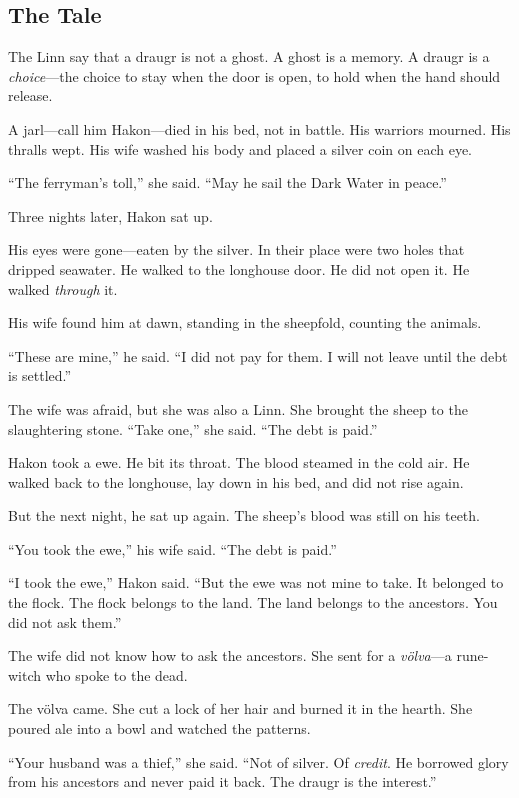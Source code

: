 \documentclass[9pt,a5paper]{extbook}
\begin{document}
\subsection*{The Tale}

The Linn say that a draugr is not a ghost. A ghost is a memory. A draugr is a \textit{choice}---the choice to stay when the door is open, to hold when the hand should release.

A jarl---call him Hakon---died in his bed, not in battle. His warriors mourned. His thralls wept. His wife washed his body and placed a silver coin on each eye.

``The ferryman's toll,'' she said. ``May he sail the Dark Water in peace.''

Three nights later, Hakon sat up.

His eyes were gone---eaten by the silver. In their place were two holes that dripped seawater. He walked to the longhouse door. He did not open it. He walked \textit{through} it.

His wife found him at dawn, standing in the sheepfold, counting the animals.

``These are mine,'' he said. ``I did not pay for them. I will not leave until the debt is settled.''

The wife was afraid, but she was also a Linn. She brought the sheep to the slaughtering stone. ``Take one,'' she said. ``The debt is paid.''

Hakon took a ewe. He bit its throat. The blood steamed in the cold air. He walked back to the longhouse, lay down in his bed, and did not rise again.

But the next night, he sat up again. The sheep's blood was still on his teeth.

``You took the ewe,'' his wife said. ``The debt is paid.''

``I took the ewe,'' Hakon said. ``But the ewe was not mine to take. It belonged to the flock. The flock belongs to the land. The land belongs to the ancestors. You did not ask them.''

The wife did not know how to ask the ancestors. She sent for a \textit{völva}---a rune-witch who spoke to the dead.

The völva came. She cut a lock of her hair and burned it in the hearth. She poured ale into a bowl and watched the patterns.

``Your husband was a thief,'' she said. ``Not of silver. Of \textit{credit}. He borrowed glory from his ancestors and never paid it back. The draugr is the interest.''
\end{document}
